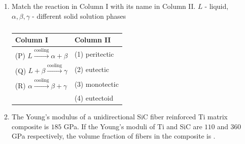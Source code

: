 \documentclass[a4paper,10pt]{article}
\begin{document}
\begin{enumerate}
    \hfill{}
    
    \item Match the reaction in Column I with its name in Column II.
    $L$ - liquid, $\alpha, \beta, \gamma$ - different solid solution phases
    \begin{table}[h!] \centering \caption*{} \label{tab:q13_material}
        \begin{tabular}{|l|l|} \hline
            \textbf{Column I} & \textbf{Column II} \\ \hline
            (P) $L \xrightarrow{\text{cooling}} \alpha + \beta$ & (1) peritectic \\
            (Q) $L + \beta \xrightarrow{\text{cooling}} \gamma$ & (2) eutectic \\
            (R) $\alpha \xrightarrow{\text{cooling}} \beta + \gamma$ & (3) monotectic \\
            & (4) eutectoid \\ \hline
        \end{tabular}
    \end{table}
    
    \hfill{}
    \begin{enumerate}
    \end{enumerate}

    \item The Young's modulus of a unidirectional SiC fiber reinforced Ti matrix composite is $185$ GPa. If the Young's moduli of Ti and SiC are $110$ and $360$ GPa respectively, the volume fraction of fibers in the composite is \underline{\hspace{2cm}}.
    
    \hfill{}


\end{enumerate}
\end{document}
